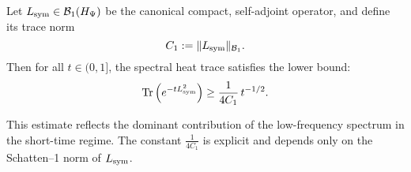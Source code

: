 \begin{lemma}
\label{lem:hk_lower_bound}
Let \( L_{\mathrm{sym}} \in \mathcal{B}_1(H_{\Psi}) \) be the canonical compact, self-adjoint operator, and define its trace norm
\[
C_1 := \| L_{\mathrm{sym}} \|_{\mathcal{B}_1}.
\]
Then for all \( t \in (0,1] \), the spectral heat trace satisfies the lower bound:
\[
\operatorname{Tr}\left( e^{-t L_{\mathrm{sym}}^2} \right) \ge \frac{1}{4C_1} \, t^{-1/2}.
\]

\medskip
\noindent
This estimate reflects the dominant contribution of the low-frequency spectrum in the short-time regime. The constant \( \frac{1}{4C_1} \) is explicit and depends only on the Schatten--1 norm of \( L_{\mathrm{sym}} \).
\end{lemma}
